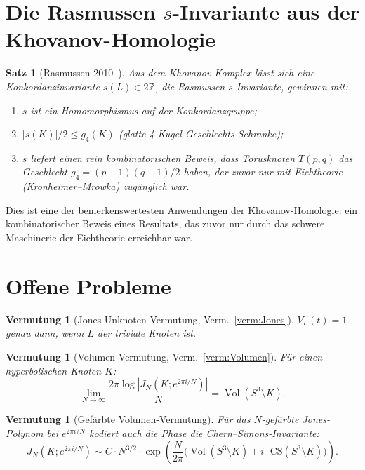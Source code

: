 \documentclass[12pt,a4paper]{amsart}
\newtheorem{satz}[theorem]{Satz}
\newtheorem{vermutung}[theorem]{Vermutung}
\theoremstyle{definition}
\theoremstyle{remark}
\newcommand{\Z}{\mathbb{Z}}
\DeclareMathOperator{\Vol}{Vol}
\begin{document}
\section{Die Rasmussen $s$-Invariante aus der Khovanov-Homologie}

\begin{satz}[Rasmussen 2010~\cite{Rasmussen2010}]
Aus dem Khovanov-Komplex lässt sich eine Konkordanzinvariante
$s(L) \in 2\Z$, die \emph{Rasmussen $s$-Invariante}, gewinnen mit:
\begin{enumerate}[label=\roman*)]
\item $s$ ist ein Homomorphismus auf der Konkordanzgruppe;
\item $|s(K)|/2 \leq g_4(K)$ (glatte 4-Kugel-Geschlechts-Schranke);
\item $s$ liefert einen rein kombinatorischen Beweis, dass Torusknoten
      $T(p,q)$ das Geschlecht $g_4 = (p-1)(q-1)/2$ haben, der zuvor
      nur mit Eichtheorie (Kronheimer--Mrowka) zugänglich war.
\end{enumerate}
\end{satz}

Dies ist eine der bemerkenswertesten Anwendungen der Khovanov-Homologie:
ein kombinatorischer Beweis eines Resultats, das zuvor nur durch das
schwere Maschinerie der Eichtheorie erreichbar war.

\section{Offene Probleme}

\begin{vermutung}[Jones-Unknoten-Vermutung, Verm.~\ref{verm:Jones}]
$V_L(t) = 1$ genau dann, wenn $L$ der triviale Knoten ist.
\end{vermutung}

\begin{vermutung}[Volumen-Vermutung, Verm.~\ref{verm:Volumen}]
Für einen hyperbolischen Knoten $K$:
\[
    \lim_{N \to \infty} \frac{2\pi \log |J_N(K; e^{2\pi i/N})|}{N}
    = \Vol(S^3 \setminus K).
\]
\end{vermutung}

\begin{vermutung}[Gefärbte Volumen-Vermutung]
\label{verm:vol-gefaerbt}
Für das $N$-gefärbte Jones-Polynom bei $e^{2\pi i /N}$ kodiert auch
die Phase die Chern--Simons-Invariante:
\[
    J_N(K; e^{2\pi i /N}) \sim C \cdot N^{3/2} \cdot \exp\left(
    \frac{N}{2\pi}\bigl(\Vol(S^3 \setminus K)
    + i \cdot \mathrm{CS}(S^3 \setminus K)\bigr) \right).
\]
\end{vermutung}
\end{document}
